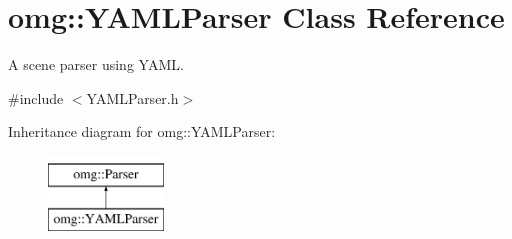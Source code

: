 \hypertarget{classomg_1_1_y_a_m_l_parser}{}\section{omg\+::Y\+A\+M\+L\+Parser Class Reference}
\label{classomg_1_1_y_a_m_l_parser}


A scene parser using Y\+A\+ML.  




{\ttfamily \#include $<$Y\+A\+M\+L\+Parser.\+h$>$}

Inheritance diagram for omg\+::Y\+A\+M\+L\+Parser\+:\begin{figure}[H]
\begin{center}
\leavevmode
\includegraphics[height=2.000000cm]{classomg_1_1_y_a_m_l_parser}
\end{center}
\end{figure}
